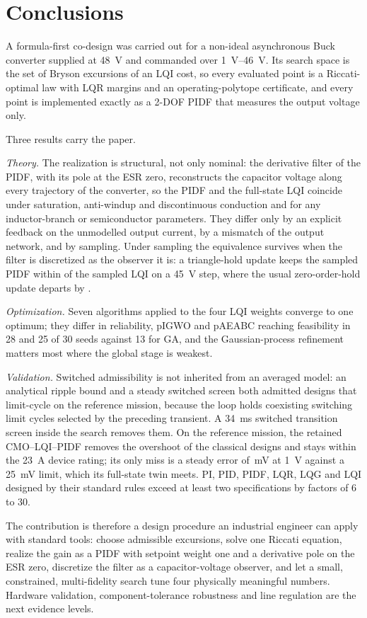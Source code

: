 \section{Conclusions}\label{sec:concl}

A formula-first co-design was carried out for a non-ideal asynchronous Buck
converter supplied at \SI{48}{V} and commanded over \SIrange{1}{46}{V}. Its
search space is the set of Bryson excursions of an LQI cost, so every evaluated
point is a Riccati-optimal law with LQR margins and an operating-polytope
certificate, and every point is implemented exactly as a 2-DOF PIDF that
measures the output voltage only.

Three results carry the paper.

\emph{Theory.} The realization is structural, not only nominal: the derivative
filter of the PIDF, with its pole at the ESR zero, reconstructs the capacitor
voltage along every trajectory of the converter, so the PIDF and the full-state
LQI coincide under saturation, anti-windup and discontinuous conduction and for
any inductor-branch or semiconductor parameters. They differ only by an explicit
feedback on the unmodelled output current, by a mismatch of the output network,
and by sampling. Under sampling the equivalence survives when the
filter is discretized as the observer it is: a triangle-hold update keeps the
sampled PIDF within \EqSampFOH{} of the sampled LQI on a \SI{45}{V} step, where
the usual zero-order-hold update departs by \EqSampZOH{}.

\emph{Optimization.} Seven algorithms applied to the four LQI weights converge
to one optimum; they differ in reliability, pIGWO and pAEABC reaching
feasibility in 28 and 25 of 30 seeds against 13 for GA, and the Gaussian-process
refinement matters most where the global stage is weakest.
\FamConclusion

\emph{Validation.} Switched admissibility is not inherited from an averaged
model: an analytical ripple bound and a steady switched screen both admitted
designs that limit-cycle on the reference mission, because the loop holds
coexisting switching limit cycles selected by the preceding transient. A
\SI{34}{ms} switched transition screen inside the search removes them. On the
reference mission, the retained CMO--LQI--PIDF removes the overshoot of the
classical designs and stays within the \SI{23}{A} device rating; its only miss
is a steady error of \SwEss{}\,mV at \SI{1}{V} against a \SI{25}{mV} limit,
which its full-state twin meets. PI, PID, PIDF, LQR, LQG and LQI designed by their standard rules
exceed at least two specifications by factors of 6 to 30.

The contribution is therefore a design procedure an industrial engineer can
apply with standard tools: choose admissible excursions, solve one Riccati
equation, realize the gain as a PIDF with setpoint weight one and a derivative
pole on the ESR zero, discretize the filter as a capacitor-voltage observer, and
let a small, constrained, multi-fidelity search tune four physically meaningful
numbers. Hardware validation, component-tolerance robustness and line
regulation are the next evidence levels.
